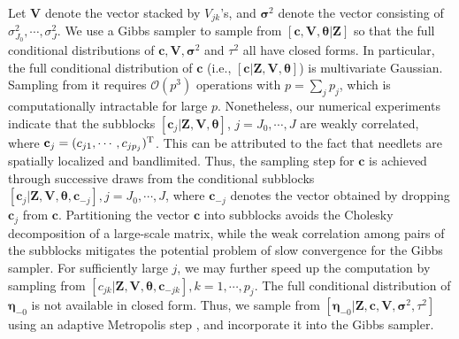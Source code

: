 \documentclass[aoas,preprint]{imsart}
\numberwithin{equation}{section}
\theoremstyle{plain}
\begin{document}
Let $\textbf{V}$ denote the vector stacked by $V_{jk}$'s, and $\bm{\sigma}^2$ denote the vector consisting of $\sigma_{J_0}^2,\cdots, \sigma_J^2$. We use a Gibbs sampler to sample from $[\textbf{c}, \textbf{V}, \bm{\theta}|\textbf{Z}]$ so that the full conditional distributions of $\textbf{c}, \textbf{V}, \bm{\sigma}^2$ and $\tau^2$ all have closed forms. In particular, the full conditional distribution of $\textbf{c}$ (i.e., $[\textbf{c}|\textbf{Z}, \textbf{V}, \bm{\theta}]$) is multivariate Gaussian. Sampling from it requires $\mathcal{O}(p^3)$ operations with $p=\sum_j p_j$, which is computationally intractable for large $p$. Nonetheless, our numerical experiments indicate that the subblocks $[\textbf{c}_j|\textbf{Z}, \textbf{V}, \bm{\theta}]$, $j=J_0,\cdots, J$ are weakly correlated, where $\textbf{c}_j=(c_{j1},\cdots, c_{jp_j})^{\rm T}$. This can be attributed to the fact that needlets are spatially localized and bandlimited. Thus, the sampling step for $\textbf{c}$ is achieved through successive draws from the conditional subblocks $[\textbf{c}_j|\textbf{Z}, \textbf{V}, \bm{\theta}, \textbf{c}_{-j}], j=J_0,\cdots, J$, where $\mathbf{c}_{-j}$ denotes the vector obtained by dropping $\textbf{c}_j$ from $\textbf{c}$. Partitioning the vector $\textbf{c}$ into subblocks avoids the Cholesky decomposition of  a large-scale matrix, while the weak correlation among pairs of the subblocks mitigates the potential problem of slow convergence for the Gibbs sampler. For sufficiently large $j$, we may further speed up the computation by sampling from $[c_{jk}|\textbf{Z}, \textbf{V}, \bm{\theta}, \textbf{c}_{-jk}], k=1,\cdots, p_j$. The full conditional distribution of $\bm{\eta}_{-0}$ is not available in closed form. Thus, we sample from $[\bm{\eta}_{-0}|\mathbf{Z}, \mathbf{c}, \mathbf{V}, \bm{\sigma}^2, \tau^2]$ using an adaptive Metropolis step \citep[Algorithm 4]{Andrieu-08}, and incorporate it into the Gibbs sampler.
 
\end{document}
